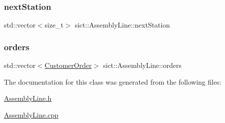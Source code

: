 \subsubsection{\texorpdfstring{nextStation}{nextStation}}
{\footnotesize\ttfamily std\+::vector$<$size\+\_\+t$>$ sict\+::\+Assembly\+Line\+::next\+Station\hspace{0.3cm}{\ttfamily [private]}}

\mbox{\label{classsict_1_1AssemblyLine_a45c7d3f30a5d67fd3259786d3e7ca676}} 
\subsubsection{\texorpdfstring{orders}{orders}}
{\footnotesize\ttfamily std\+::vector$<$\mbox{\hyperlink{classsict_1_1CustomerOrder}{Customer\+Order}}$>$ sict\+::\+Assembly\+Line\+::orders\hspace{0.3cm}{\ttfamily [private]}}



The documentation for this class was generated from the following files\+:\begin{DoxyCompactItemize}
\item 
\mbox{\hyperlink{AssemblyLine_8h}{Assembly\+Line.\+h}}\item 
\mbox{\hyperlink{AssemblyLine_8cpp}{Assembly\+Line.\+cpp}}\end{DoxyCompactItemize}
